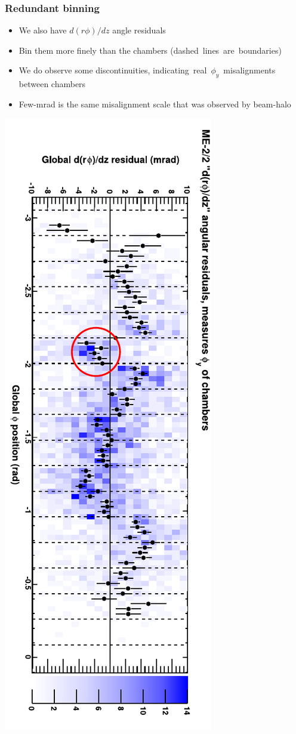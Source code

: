 \documentclass[compress]{beamer}
\begin{document}
\begin{frame}
\frametitle{Redundant binning}

\begin{itemize}\setlength{\itemsep}{0.25 cm}
\item We also have $d(r\phi)/dz$ angle residuals
\item Bin them more finely than the chambers \mbox{(dashed lines are boundaries)\hspace{-1 cm}}
\item We do observe some discontinuities, \mbox{indicating real $\phi_y$ misalignments\hspace{-1 cm}} \\ between chambers
\item Few-mrad is the same misalignment scale that was observed by beam-halo
\end{itemize}

\vspace{0.5 cm}
\includegraphics[height=\linewidth, angle=90]{datacsc_phiy_misalignment.pdf}
\end{frame}
\end{document}
